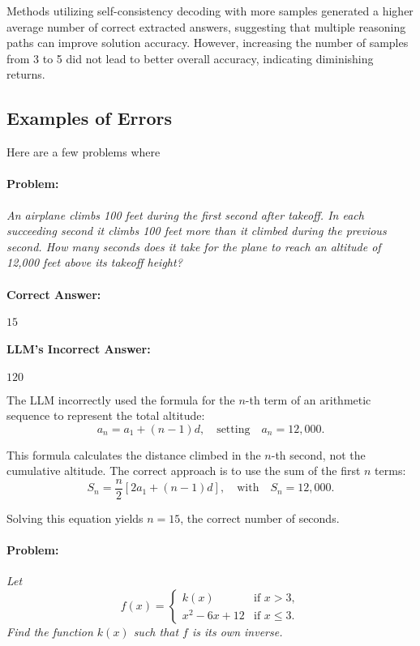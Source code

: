 \documentclass[11pt,a4paper]{article}
\begin{document}
Methods utilizing self-consistency decoding with more samples generated a higher average number of correct extracted answers, suggesting that multiple reasoning paths can improve solution accuracy. However, increasing the number of samples from 3 to 5 did not lead to better overall accuracy, indicating diminishing returns.

\subsection{Examples of Errors}
Here are a few problems where 

\paragraph{Problem:} \textit{An airplane climbs 100 feet during the first second after takeoff. In each succeeding second it climbs 100 feet more than it climbed during the previous second. How many seconds does it take for the plane to reach an altitude of 12,000 feet above its takeoff height?}

\paragraph{Correct Answer:} \( 15 \)

\paragraph{LLM's Incorrect Answer:} \( 120 \)

\begin{tcolorbox}[colback=gray!10, colframe=black, title=\textbf{Step-by-Step Analysis}, fonttitle=\bfseries]
\footnotesize
The LLM incorrectly used the formula for the \( n \)-th term of an arithmetic sequence to represent the total altitude:
\[
a_n = a_1 + (n - 1)d, \quad \text{setting} \quad a_n = 12,000.
\]

This formula calculates the distance climbed in the \( n \)-th second, not the cumulative altitude. The correct approach is to use the sum of the first \( n \) terms:
\[
S_n = \dfrac{n}{2}\left[2a_1 + (n - 1)d\right], \quad \text{with} \quad S_n = 12,000.
\]

Solving this equation yields \( n = 15 \), the correct number of seconds.
\end{tcolorbox}

\paragraph{Problem:} \textit{Let
\[
f(x) =
\begin{cases}
k(x) & \text{if } x > 3, \\
x^2 - 6x + 12 & \text{if } x \leq 3.
\end{cases}
\]
Find the function \( k(x) \) such that \( f \) is its own inverse.}
\end{document}
